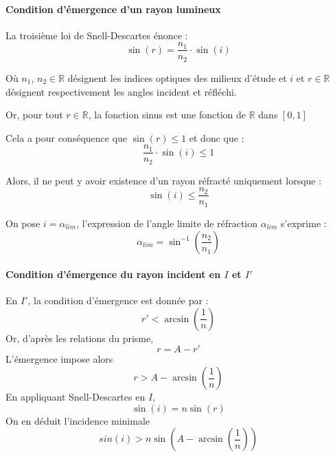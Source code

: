 \paragraph{Condition d'émergence d'un rayon lumineux} 
La troisième loi de Snell-Descartes énonce :
\[\sin(r) = \frac{n_1}{n_2} \cdot \sin(i) \]

\noindent Où $n_1$, $n_2 \in \mathbb{R}$ 
désignent les indices optiques des milieux d'étude 
et $i$ et $r \in \mathbb{R}$ désignent respectivement les angles incident et réfléchi.  
\medskip 

\noindent Or, pour tout \(r \in \mathbb{R}\), 
la fonction sinus est une fonction de $\mathbb{R}$ dans $[0, 1]$

\noindent Cela a pour conséquence que $\sin(r) \leq 1$ 
et donc que :
\[\frac{n_1}{n_2} \cdot \sin(i) \leq 1\]

\noindent Alors, il ne peut y avoir existence d'un rayon réfracté uniquement lorsque : 
\[\sin(i) \leq \frac{n_2}{n_1}\]

\noindent On pose $i = \alpha_{lim}$, 
l'expression de l'angle limite de réfraction $\alpha_{lim}$ s'exprime : 
\begin{equation}
    \alpha_{lim} = \sin^{-1}\left (\frac{n_2}{n_1} \right )
    \label{eq:alpha_lim}
\end{equation}

\paragraph{Condition d'émergence du rayon incident en $I$ et $I'$}
En $I'$, 
la condition d'émergence est donnée par :  
\[r' < \arcsin\left(\frac{1}{n}\right)\]
Or, d'après les relations du prisme, 
\[r = A - r'\]
L'émergence impose alors 
\[r > A - \arcsin\left(\frac{1}{n}\right)\]
En appliquant Snell-Descartes en $I$, 
\[\sin(i) = n \sin(r)\]
On en déduit l'incidence minimale 
\[sin(i) > n \sin\left( A - \arcsin\left(\frac{1}{n}\right) \right)\]